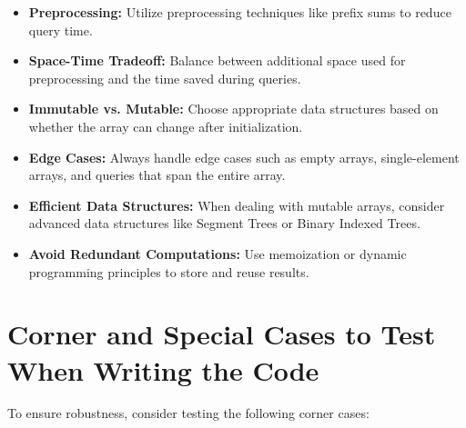 \begin{itemize}
    \item \textbf{Preprocessing:} Utilize preprocessing techniques like prefix sums to reduce query time.
    
    \item \textbf{Space-Time Tradeoff:} Balance between additional space used for preprocessing and the time saved during queries.
    
    \item \textbf{Immutable vs. Mutable:} Choose appropriate data structures based on whether the array can change after initialization.
    
    \item \textbf{Edge Cases:} Always handle edge cases such as empty arrays, single-element arrays, and queries that span the entire array.
    
    \item \textbf{Efficient Data Structures:} When dealing with mutable arrays, consider advanced data structures like Segment Trees or Binary Indexed Trees.
    
    \item \textbf{Avoid Redundant Computations:} Use memoization or dynamic programming principles to store and reuse results.
\end{itemize}

\section*{Corner and Special Cases to Test When Writing the Code}

To ensure robustness, consider testing the following corner cases:

